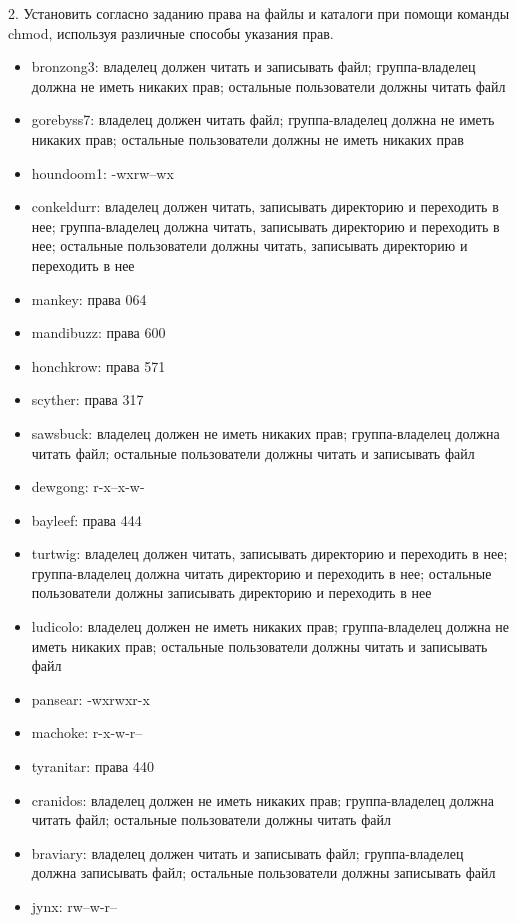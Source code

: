 \documentclass{article}
\begin{document}
2. Установить согласно заданию права на файлы и каталоги при помощи команды chmod, используя различные способы указания прав.

\begin{itemize}
  \item bronzong3: владелец должен читать и записывать файл; группа-владелец должна не иметь никаких прав; остальные пользователи должны читать файл
  \item gorebyss7: владелец должен читать файл; группа-владелец должна не иметь никаких прав; остальные пользователи должны не иметь никаких прав
  \item houndoom1: -wxrw--wx
  \item conkeldurr: владелец должен читать, записывать директорию и переходить в нее; группа-владелец должна читать, записывать директорию и переходить в нее; остальные пользователи должны читать, записывать директорию и переходить в нее
  \item mankey: права 064
  \item mandibuzz: права 600
  \item honchkrow: права 571
  \item scyther: права 317
  \item sawsbuck: владелец должен не иметь никаких прав; группа-владелец должна читать файл; остальные пользователи должны читать и записывать файл
  \item dewgong: r-x--x-w-
  \item bayleef: права 444
  \item turtwig: владелец должен читать, записывать директорию и переходить в нее; группа-владелец должна читать директорию и переходить в нее; остальные пользователи должны записывать директорию и переходить в нее
  \item ludicolo: владелец должен не иметь никаких прав; группа-владелец должна не иметь никаких прав; остальные пользователи должны читать и записывать файл
  \item pansear: -wxrwxr-x
  \item machoke: r-x-w-r--
  \item tyranitar: права 440
  \item cranidos: владелец должен не иметь никаких прав; группа-владелец должна читать файл; остальные пользователи должны читать файл
  \item braviary: владелец должен читать и записывать файл; группа-владелец должна записывать файл; остальные пользователи должны записывать файл
  \item jynx: rw--w-r--

\end{itemize}
\end{document}
